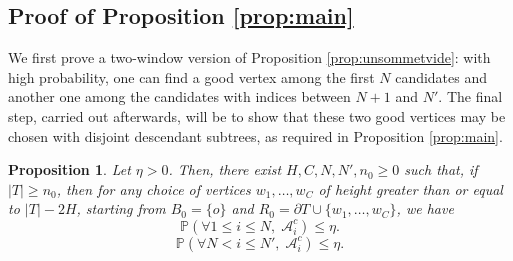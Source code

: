 \documentclass[french]{article}
\newtheorem{prop}[theorem]{Proposition}
\renewcommand{\P}{\mathbb{P}}
\newcommand{\Tf}{T}
\renewcommand{\1}{\mathds{1}}
\begin{document}
\subsection{Proof of Proposition \ref{prop:main}}
We first prove a two-window version of Proposition \ref{prop:unsommetvide}: with high probability, one can find a good vertex among the first $N$ candidates and another one among the candidates with indices between $N+1$ and $N'$. The final step, carried out afterwards, will be to show that these two good vertices may be chosen with disjoint descendant subtrees, as required in Proposition \ref{prop:main}.

\begin{prop}\label{prop:deuxcas} Let $\eta>0$. Then, there exist $H,C,N,N',n_0\ge 0$ such that, if $|\Tf|\ge n_0$, then for any choice of vertices $w_1,\ldots,w_C$ of height greater than or equal to $|\Tf|-2H$, starting from $B_0=\{o\}$ and $R_0=\partial \Tf \cup\{w_1,\ldots,w_C\}$, we have
\begin{equation}\label{eq:prop_point1}
 \P(\forall 1\le i\le N,\; \mathcal{A}_i^c)\le \eta.
\end{equation}
\begin{equation}\label{eq:prop_point2}
\P(\forall N<i\le N',\; \mathcal{A}_i^c)\le \eta.
\end{equation}
\end{prop}
\end{document}

